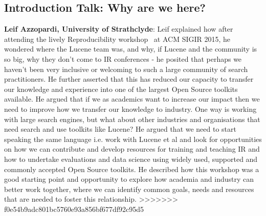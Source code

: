 \subsection*{Introduction Talk: Why are we here?}
{\bf Leif Azzopardi, University of Strathclyde}:
Leif explained how after attending the lively Reproducibility workshop~\cite{arguello2016repro} at ACM SIGIR 2015, he wondered where the Lucene team was, and why, if Lucene and the community is so big, why they don't come to IR conferences - he posited that perhaps we haven't been very inclusive or welcoming to such a large community of search practitioners. He further asserted that this has reduced our capacity to transfer our knowledge and experience into one of the largest Open Source toolkits available. He argued that if we as academics want to increase our impact then we need to improve how we transfer our knowledge to industry. One way is working with large search engines, but what about other industries and organisations that need search and use toolkits like Lucene? He argued that we need to start speaking the same language i.e. work with Lucene et al and look for opportunities on how we can contribute and develop resources for training and teaching IR and how to undertake evaluations and data science using widely used, supported and commonly accepted Open Source toolkits. He described how this workshop was a good starting point and opportunity to explore how academia and industry can better work together, where we can identify common goals, needs and resources that are needed to foster this relationship. 
>>>>>>> f0e54b9adc801bc5760e93a856bf677df92c95d5










